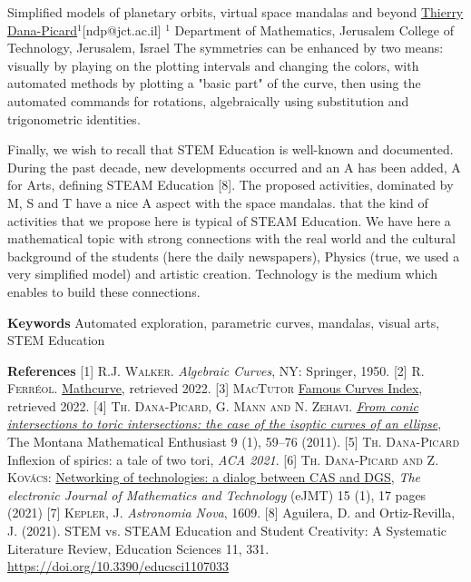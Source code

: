 \begin{abstract_online}{Simplified models of planetary orbits, virtual space mandalas and beyond}{%
        \underline{Thierry Dana-Picard}$^{1}$}{[ndp@jct.ac.il]
        }{%
        $^1$ Department of Mathematics, Jerusalem College of Technology, Jerusalem, Israel}
The symmetries can be enhanced by two means: visually by playing on the plotting intervals and changing the colors, with automated methods by plotting a "basic part" of the curve, then using the automated commands for rotations, algebraically using substitution and trigonometric identities.

Finally, we wish to recall that STEM Education is well-known and documented. During the past decade, new developments occurred and an A has been added, A for Arts, defining STEAM Education [8]. The proposed activities, dominated by M, S and T have a nice A aspect with the space mandalas.  that the kind of activities that we propose here is typical of STEAM Education. We have here a mathematical topic with strong connections with the real world and the cultural background of the students (here the daily newspapers),  Physics (true, we used a very simplified model) and artistic creation. Technology is the medium which enables to build these connections.


\textbf{Keywords} \newline{} Automated exploration, parametric curves, mandalas, visual arts, STEM Education

\textbf{References} \newline{}
[1] \textsc{R.J. Walker}. \emph{Algebraic Curves}, NY: Springer, 1950.\newline{}
[2] \textsc{R. Ferr\' eol}. \href{http://mathcurve.com}{Mathcurve}, retrieved 2022.\newline{}
[3] \textsc{MacTutor} \href{https://mathshistory.st-andrews.ac.uk/Curves/}{Famous Curves Index}, retrieved 2022. \newline{}
[4] \textsc{Th. Dana-Picard, G. Mann and N. Zehavi}. \href{https://scholarworks.umt.edu/tme/vol6/iss3/13}{\emph{From conic intersections to toric intersections: the case of the isoptic curves of an ellipse}}, The Montana Mathematical Enthusiast 9 (1), 59--76 (2011).\newline{}
[5] \textsc{Th. Dana-Picard} Inflexion of spirics: a tale of two tori, \emph{ACA 2021}.\newline{}
[6] \textsc{Th. Dana-Picard and Z. Kovács}: \href{https://php.radford.edu/~ejmt/deliveryBoy.php?paper=eJMT_v15n1p3}{Networking of technologies: a dialog between CAS and DGS}, \emph{The electronic Journal of Mathematics and Technology} (eJMT) 15 (1), 17 pages (2021)\newline{}
[7] \textsc{Kepler, J.} \emph{Astronomia Nova}, 1609.\newline{}
[8] Aguilera, D. and Ortiz-Revilla, J. (2021). STEM vs. STEAM Education and Student Creativity: A Systematic Literature Review, Education Sciences 11,
331. \url{https://doi.org/10.3390/educsci1107033}

\end{abstract_online}
